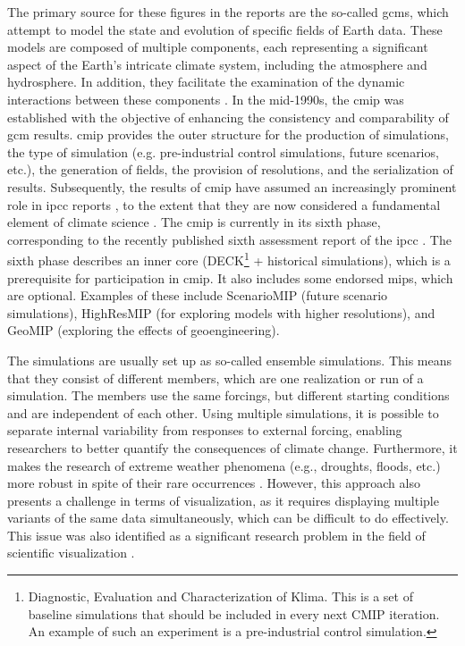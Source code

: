 The primary source for these figures in the reports are the so-called \acp{gcm}, which attempt to model the state and evolution of specific fields of Earth data.
These models are composed of multiple components, each representing a significant aspect of the Earth's intricate climate system, including the atmosphere and hydrosphere. 
In addition, they facilitate the examination of the dynamic interactions between these components \cite{vietinghoffdiss}.  
In the mid-1990s, the \ac{cmip} was established with the objective of enhancing the consistency and comparability of \ac{gcm} results. 
\ac{cmip} provides the outer structure for the production of simulations, the type of simulation (e.g. pre-industrial control simulations, future scenarios, etc.), the generation of fields, the provision of resolutions, and the serialization of results.
Subsequently, the results of \ac{cmip} have assumed an increasingly prominent role in \ac{ipcc} reports \cite{touzepeiffer_coupled_2020}, to the extent that they are now considered a fundamental element of climate science \cite{eyring_overview_2016}. 
The \ac{cmip} is currently in its sixth phase, corresponding to the recently published sixth assessment report of the \ac{ipcc} \cite{lee2024climate}. 
The sixth phase describes an inner core (DECK\footnote{Diagnostic, Evaluation and Characterization of Klima. This is a set of baseline simulations that should be included in every next CMIP iteration. An example of such an experiment is a pre-industrial control simulation.} + historical simulations), which is a prerequisite for participation in \ac{cmip}. It also includes some endorsed \acp{mip}, which are optional. Examples of these include ScenarioMIP (future scenario simulations), HighResMIP (for exploring models with higher resolutions), and GeoMIP (exploring the effects of geoengineering). \cite{eyring_overview_2016}

The simulations are usually set up as so-called ensemble simulations. 
This means that they consist of different members, which are one realization or run of a simulation. 
The members use the same forcings, but different starting conditions and are independent of each other. 
Using multiple simulations, it is possible to separate internal variability from responses to external forcing, enabling researchers to better quantify the consequences of climate change. 
Furthermore, it makes the research of extreme weather phenomena (e.g., droughts, floods, etc.) more robust in spite of their rare occurrences \cite{maher_large_2021}.
However, this approach also presents a challenge in terms of visualization, as it requires displaying multiple variants of the same data simultaneously, which can be difficult to do effectively.
This issue was also identified as a significant research problem in the field of scientific visualization \cite{johnson_top_2004}. 


